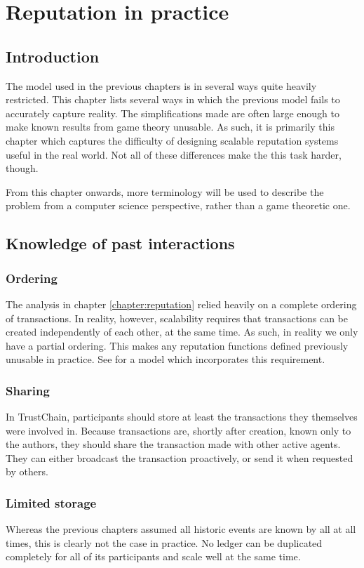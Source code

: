 \chapter{Reputation in practice}\label{chapter:differences}
\section{Introduction}
The model used in the previous chapters is in several ways quite heavily restricted. This chapter lists several ways in which the previous model fails to accurately capture reality. The simplifications made are often large enough to make known results from game theory unusable. As such, it is primarily this chapter which captures the difficulty of designing scalable reputation systems useful in the real world. Not all of these differences make the this task harder, though.

From this chapter onwards, more terminology will be used to describe the problem from a computer science perspective, rather than a game theoretic one.

\section{Knowledge of past interactions}
\subsection{Ordering}
The analysis in chapter \ref{chapter:reputation} relied heavily on a complete ordering of transactions. In reality, however, scalability requires that transactions can be created independently of each other, at the same time. As such, in reality we only have a partial ordering. This makes any reputation functions defined previously unusable in practice. See \cite{otte2016sybil} for a model which incorporates this requirement.

\subsection{Sharing}
In TrustChain, participants should store at least the transactions they themselves were involved in. Because transactions are, shortly after creation, known only to the authors, they should share the transaction made with other active agents. They can either broadcast the transaction proactively, or send it when requested by others.

\subsection{Limited storage}
Whereas the previous chapters assumed all historic events are known by all at all times, this is clearly not the case in practice. No ledger can be duplicated completely for all of its participants and scale well at the same time.

